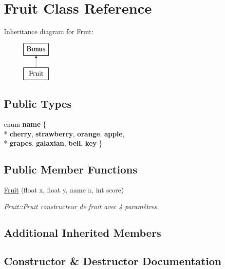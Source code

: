 \hypertarget{class_fruit}{}\section{Fruit Class Reference}
\label{class_fruit}
Inheritance diagram for Fruit\+:\begin{figure}[H]
\begin{center}
\leavevmode
\includegraphics[height=2.000000cm]{class_fruit}
\end{center}
\end{figure}
\subsection*{Public Types}
\begin{DoxyCompactItemize}
\item 
\hypertarget{class_fruit_a4601170524968146c46b163a1bc8ef1d}{}enum {\bfseries name} \{ \\*
{\bfseries cherry}, 
{\bfseries strawberry}, 
{\bfseries orange}, 
{\bfseries apple}, 
\\*
{\bfseries grapes}, 
{\bfseries galaxian}, 
{\bfseries bell}, 
{\bfseries key}
 \}\label{class_fruit_a4601170524968146c46b163a1bc8ef1d}

\end{DoxyCompactItemize}
\subsection*{Public Member Functions}
\begin{DoxyCompactItemize}
\item 
\hyperlink{class_fruit_a4128bc0d6d093a90136413867566718e}{Fruit} (float x, float y, name n, int score)
\begin{DoxyCompactList}\small\item\em Fruit\+::\+Fruit constructeur de fruit avec 4 paramètres. \end{DoxyCompactList}\end{DoxyCompactItemize}
\subsection*{Additional Inherited Members}


\subsection{Constructor \& Destructor Documentation}
\hypertarget{class_fruit_a4128bc0d6d093a90136413867566718e}{}
